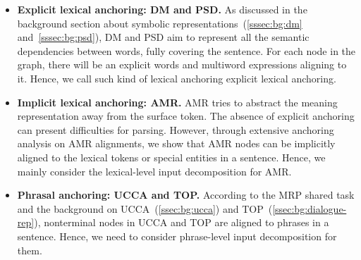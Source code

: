 \begin{itemize}
\item \textbf{Explicit lexical anchoring: DM and PSD.} As discussed in
  the background section about symbolic
  representations~(\autoref{sssec:bg:dm} and~\autoref{sssec:bg:psd}),
  DM and PSD aim to represent all the semantic dependencies between
  words, fully covering the sentence. For each node in the graph,
  there will be an explicit words and multiword expressions aligning
  to it. Hence, we call such kind of lexical anchoring explicit
  lexical anchoring.

\item \textbf{Implicit lexical anchoring: AMR.} AMR tries to abstract
  the meaning representation away from the surface token. The absence
  of explicit anchoring can present difficulties for parsing. However,
  through extensive anchoring analysis on AMR alignments, we show that
  AMR nodes can be implicitly aligned to the lexical tokens or special
  entities in a sentence. Hence, we mainly consider the lexical-level
  input decomposition for AMR.

\item \textbf{Phrasal anchoring: UCCA and TOP.} According to the MRP
  shared task and the background on UCCA~(\autoref{ssec:bg:ucca}) and
  TOP~(\autoref{ssec:bg:dialogue-rep}), nonterminal nodes in UCCA and TOP are
  aligned to phrases in a sentence. Hence, we need to consider
  phrase-level input decomposition for them.
\end{itemize}

